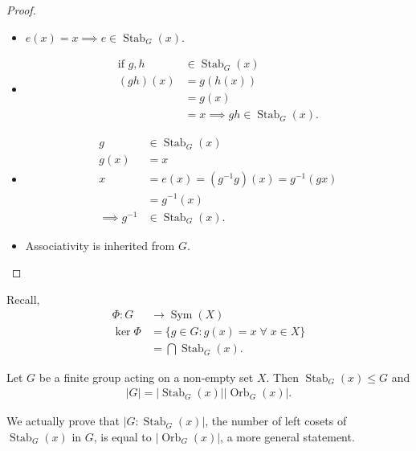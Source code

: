 \begin{proof} \mbox{}
    \begin{itemize} 
        \item $e(x) = x \implies e \in \operatorname{Stab}_G(x)$.
        \item \begin{align*}
            \text{if } g, h &\in \operatorname{Stab}_G(x) \\
            (gh)(x) &= g(h(x)) \\
            &= g(x) \\
            &= x \implies gh \in \operatorname{Stab}_G(x).
            \end{align*} 
        \item \begin{align*}
            g &\in \operatorname{Stab}_G(x) \\
            g(x) &= x \\
            x &= e(x) = (g^{-1} g)(x) = g^{-1}(gx) \\
            &= g^{-1}(x) \\
            \implies g^{-1} &\in \operatorname{Stab}_G(x).
        \end{align*} 
        \item Associativity is inherited from $G$.
    \end{itemize} 
\end{proof} 

\begin{remark} 
    Recall,  \begin{align*}
        \Phi : G &\to \operatorname{Sym}(X) \\
        \ker \Phi &= \{ g \in G : g(x) = x \; \forall \; x \in X \} \\
        &= \bigcap \operatorname{Stab}_G(x).
    \end{align*}
\end{remark} 

\begin{theorem} \label{thm:orbit}
    Let $G$ be a finite group acting on a non-empty set $X$.
    Then $\operatorname{Stab}_G(x) \leq G$ and 
    \begin{align*}
        |G| = |\operatorname{Stab}_G(x)| |\operatorname{Orb}_G(x)|.
    \end{align*} 
\end{theorem} 

\begin{remark}
    We actually prove that $|G : \operatorname{Stab}_G(x)|$, the number of left cosets of $\operatorname{Stab}_G(x)$ in $G$, is equal to $|\operatorname{Orb}_G(x)|$, a more general statement.
\end{remark} 

